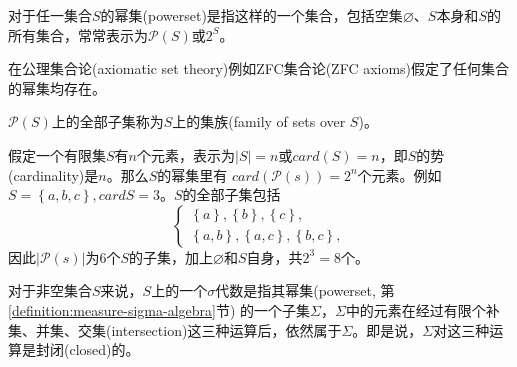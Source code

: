 \begin{definition}[幂集]
  \label{definition:measure-powerset}
  对于任一集合$S$的幂集(powerset)是指这样的一个集合，包括空集$\varnothing$、$S$本身和$S$的所有集合，常常表示为$\mathcal{P}(S)$或$2^{S}$。

  在公理集合论(axiomatic set theory)例如ZFC集合论(ZFC axioms)假定了任何集合的幂集均存在。

  $\mathcal{P}(S)$上的全部子集称为$S$上的集族(family of sets over $S$)。
\end{definition}

假定一个有限集$S$有$n$个元素，表示为$|S|=n$或$card(S)=n$，即$S$的势(cardinality)是$n$。那么$S$的幂集里有 $card(\mathcal{P}(s)) = 2^n$个元素。例如$S=\left\{a,b,c\right\}, card{S}=3$。$S$的全部子集包括
\begin{equation*}
  \begin{cases}
    \left\{ a \right\}, \left\{ b\right\},\left\{c\right\}, \\
    \left\{ a,b \right\},\left\{ a,c \right\},\left\{ b,c \right\},
  \end{cases}
\end{equation*}
因此$\left| \mathcal{P}(s) \right|$为6个$S$的子集，加上$\varnothing$和$S$自身，共$2^3=8$个。

对于非空集合$S$来说，$S$上的一个$\sigma$代数是指其幂集(powerset, 第\ref{definition:measure-sigma-algebra}节) 的一个子集$\Sigma$，$\Sigma$中的元素在经过有限个补集、并集、交集(intersection)这三种运算后，依然属于$\Sigma$。即是说，$\Sigma$对这三种运算是封闭(closed)的。

